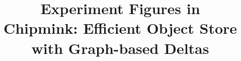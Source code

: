 \documentclass[sigconf,nonacm,screen]{acmart}
\title{Experiment Figures in\\Chipmink: Efficient Object Store with Graph-based Deltas}
\begin{document}
    
    \maketitle
    \onecolumn

    
    
    
    
    
    
    
    
    
    
    
    
    
    
    
\end{document}
